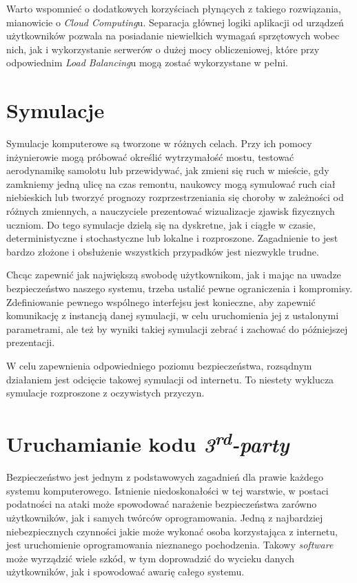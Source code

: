 \par Warto wspomnieć o dodatkowych korzyściach płynących z takiego rozwiązania, mianowicie o \emph{Cloud Computing}u. Separacja głównej logiki aplikacji od urządzeń użytkowników pozwala na posiadanie niewielkich wymagań sprzętowych wobec nich, jak i wykorzystanie serwerów o dużej mocy obliczeniowej, które przy odpowiednim \emph{Load Balancing}u mogą zostać wykorzystane w pełni.

\section{Symulacje}

\par Symulacje komputerowe są tworzone w różnych celach. Przy ich pomocy inżynierowie mogą próbować określić wytrzymałość mostu, testować aerodynamikę samolotu lub przewidywać, jak zmieni się ruch w mieście, gdy zamkniemy jedną ulicę na czas remontu, naukowcy mogą symulować ruch ciał niebieskich lub tworzyć prognozy rozprzestrzeniania się choroby w zależności od różnych zmiennych, a nauczyciele prezentować wizualizacje zjawisk fizycznych uczniom. Do tego symulacje dzielą się na dyskretne, jak i ciągłe w czasie, deterministyczne i stochastyczne\cite{mchaney1991computer} lub lokalne i rozproszone. Zagadnienie to jest bardzo złożone i obsłużenie wszystkich przypadków jest niezwykle trudne.

\par Chcąc zapewnić jak największą swobodę użytkownikom, jak i mając na uwadze bezpieczeństwo naszego systemu, trzeba ustalić pewne ograniczenia i kompromisy. Zdefiniowanie pewnego wspólnego interfejsu jest konieczne, aby zapewnić komunikację z instancją danej symulacji, w celu uruchomienia jej z ustalonymi parametrami, ale też by wyniki takiej symulacji zebrać i zachować do późniejszej prezentacji.

\par W celu zapewnienia odpowiedniego poziomu bezpieczeństwa, rozsądnym działaniem jest odcięcie takowej symulacji od internetu. To niestety wyklucza symulacje rozproszone z oczywistych przyczyn.

\section{Uruchamianie kodu \emph{3\textsuperscript{rd}-party}}

\par Bezpieczeństwo jest jednym z podstawowych zagadnień dla prawie każdego systemu komputerowego. Istnienie niedoskonałości w tej warstwie, w postaci podatności na ataki może spowodować narażenie bezpieczeństwa zarówno użytkowników, jak i samych twórców oprogramowania. Jedną z najbardziej niebezpiecznych czynności jakie może wykonać osoba korzystająca z internetu, jest uruchomienie oprogramowania nieznanego pochodzenia. Takowy \emph{software} może wyrządzić wiele szkód, w tym doprowadzić do wycieku danych użytkowników, jak i spowodować awarię całego systemu.

